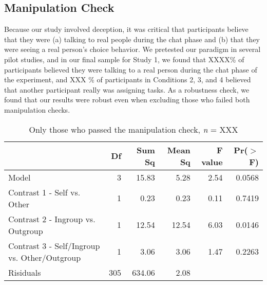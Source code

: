 \documentclass[12pt,]{article}
\begin{document}

\newpage
\subsection{Manipulation Check}
\label{appendix:manip1}

Because our study involved deception, it was critical that participants believe that they were (a) talking to real people during the chat phase and (b) that they were seeing a real person's choice behavior. We pretested our paradigm in several pilot studies, and in our final sample for Study 1, we found that  XXXX\% of participants believed they were talking to a real person during the chat phase of the experiment, and XXX \% of participants in Conditions 2, 3, and 4 believed that another participant really was assigning tasks. As a robustness check, we found that our results were robust even when excluding those who failed both manipulation checks. 

\vspace{0.6cm}

\begin{table}[ht]
\centering
\begin{tabular}{lrrrrr}
  \hline
 & Df & Sum Sq & Mean Sq & F value & Pr($>$F) \\ 
  \hline
Model & 3 & 15.83 & 5.28 & 2.54 & 0.0568 \\ 
  Contrast 1 - Self vs. Other & 1 & 0.23 & 0.23 & 0.11 & 0.7419 \\ 
  Contrast 2 - Ingroup vs. Outgroup & 1 & 12.54 & 12.54 & 6.03 & 0.0146 \\ 
  Contrast 3 - Self/Ingroup vs. Other/Outgroup & 1 & 3.06 & 3.06 & 1.47 & 0.2263 \\ 
  Risiduals & 305 & 634.06 & 2.08 &  &  \\ 
   \hline
\end{tabular}
\caption{{\color{red}{INCOMPLETE}}Only those who passed the manipulation check, \emph{n} = XXX} 
\label{manip1}
\end{table}










\end{document}
